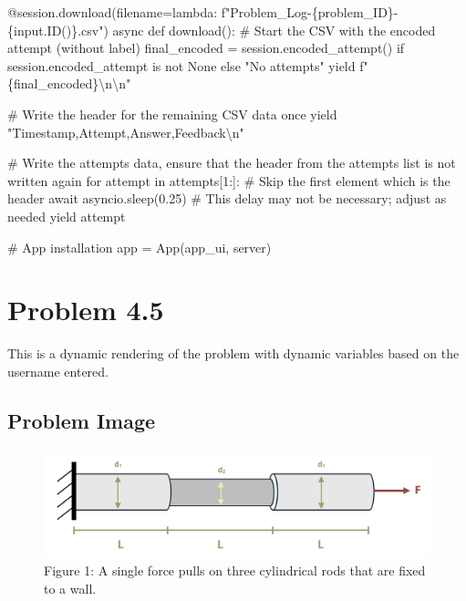 \documentclass[
  letterpaper,
  DIV=11,
  numbers=noendperiod]{scrreprt}
\newenvironment{Shaded}{\begin{snugshade}}{\end{snugshade}}
\newcommand{\NormalTok}[1]{\textcolor[rgb]{0.00,0.23,0.31}{#1}}
\begin{document}
\begin{Shaded}
\begin{Highlighting}[]
\NormalTok{    @session.download(filename=lambda: f"Problem\_Log{-}\{problem\_ID\}{-}\{input.ID()\}.csv")}
\NormalTok{    async def download():}
\NormalTok{        \# Start the CSV with the encoded attempt (without label)}
\NormalTok{        final\_encoded = session.encoded\_attempt() if session.encoded\_attempt is not None else "No attempts"}
\NormalTok{        yield f"\{final\_encoded\}\textbackslash{}n\textbackslash{}n"}
        
\NormalTok{        \# Write the header for the remaining CSV data once}
\NormalTok{        yield "Timestamp,Attempt,Answer,Feedback\textbackslash{}n"}
        
\NormalTok{        \# Write the attempts data, ensure that the header from the attempts list is not written again}
\NormalTok{        for attempt in attempts[1:]:  \# Skip the first element which is the header}
\NormalTok{            await asyncio.sleep(0.25)  \# This delay may not be necessary; adjust as needed}
\NormalTok{            yield attempt}


\NormalTok{\# App installation}
\NormalTok{app = App(app\_ui, server)}
\end{Highlighting}
\end{Shaded}

\chapter*{Problem 4.5}\label{problem-4.5}


This is a dynamic rendering of the problem with dynamic variables based
on the username entered.

\section*{Problem Image}\label{problem-image-18}


\begin{figure}[H]

{\centering \includegraphics{images/188.png}

}

\caption{Figure 1: A single force pulls on three cylindrical rods that
are fixed to a wall.}

\end{figure}%
\end{document}
